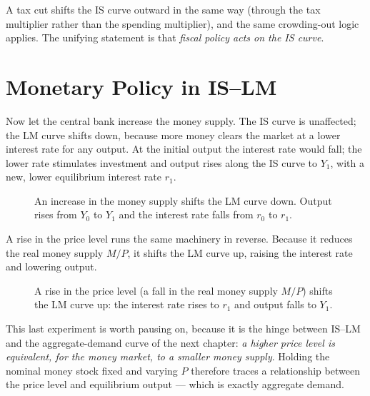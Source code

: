 
A tax cut shifts the IS curve outward in the same way (through the tax multiplier rather than the spending multiplier), and the same crowding-out logic applies. The unifying statement is that \emph{fiscal policy acts on the IS curve}.

\section{Monetary Policy in IS--LM}

Now let the central bank increase the money supply. The IS curve is unaffected; the LM curve shifts down, because more money clears the market at a lower interest rate for any output. At the initial output the interest rate would fall; the lower rate stimulates investment and output rises along the IS curve to $Y_1$, with a new, lower equilibrium interest rate $r_1$.

\begin{figure}[h]
\centering

\caption{An increase in the money supply shifts the LM curve down. Output rises from $Y_0$ to $Y_1$ and the interest rate falls from $r_0$ to $r_1$.}
\label{fig:macro-23}
\end{figure}

A rise in the price level runs the same machinery in reverse. Because it reduces the real money supply $M/P$, it shifts the LM curve up, raising the interest rate and lowering output.

\begin{figure}[h]
\centering

\caption{A rise in the price level (a fall in the real money supply $M/P$) shifts the LM curve up: the interest rate rises to $r_1$ and output falls to $Y_1$.}
\label{fig:macro-24}
\end{figure}

This last experiment is worth pausing on, because it is the hinge between IS--LM and the aggregate-demand curve of the next chapter: \emph{a higher price level is equivalent, for the money market, to a smaller money supply}. Holding the nominal money stock fixed and varying $P$ therefore traces a relationship between the price level and equilibrium output --- which is exactly aggregate demand.

